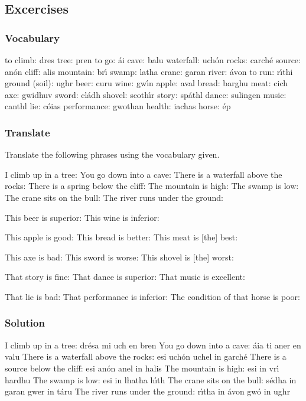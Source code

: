 \subsection{Excercises}

\subsubsection{Vocabulary}

to climb: dres
tree: pren
to go: \'{a}i
cave: balu
waterfall: uch\'{o}n
rocks: carch\'{e}
source: an\'{o}n
cliff: alis
mountain: br\'{\i}
swamp: latha
crane: garan
river: \'{a}von
to run: r\'{\i}thi
ground (soil): ughr
beer: curu
wine: gw\'{\i}n
apple: aval
bread: barghu
meat: cich
axe: gwidhuv
sword: cl\'{a}dh
shovel: scoth\'{\i}r
story: sp\'{a}thl
dance: sulingen
music: canthl
lie: c\'{o}ias
performance: gwothan
health: iachas
horse: \'{e}p

\subsubsection{Translate}

Translate the following phrases using the vocabulary given.

I climb up in a tree:
You go down into a cave:
There is a waterfall above the rocks:
There is a spring below the cliff:
The mountain is high:
The swamp is low:
The crane sits on the bull:
The river runs under the ground:

This beer is superior:
This wine is inferior:

This apple is good:
This bread is better:
This meat is [the] best:

This axe is bad:
This sword is worse:
This shovel is [the] worst:

That story is fine:
That dance is superior:
That music is excellent:

That lie is bad:
That performance is inferior:
The condition of that horse is poor:

\newpage
\subsubsection{Solution}

I climb up in a tree: dr\'{e}sa mi uch en bren
You go down into a cave: \'{a}ia ti aner en valu
There is a waterfall above the rocks: esi uch\'{o}n uchel in garch\'{e}
There is a source below the cliff: esi an\'{o}n anel in halis
The mountain is high: esi in vr\'{\i} hardhu
The swamp is low: esi in lhatha h\'{\i}th
The crane sits on the bull: s\'{e}dha in garan gwer in t\'{a}ru
The river runs under the ground: r\'{\i}tha in \'{a}von gw\'{o} in ughr

